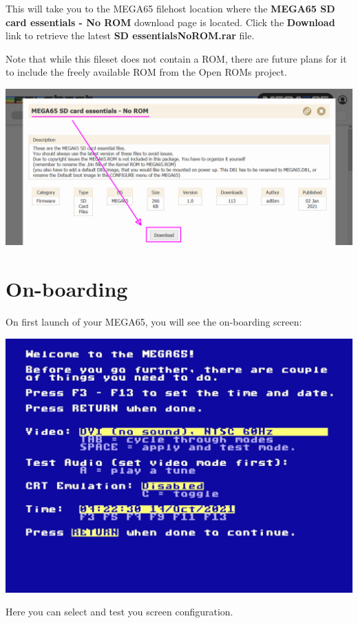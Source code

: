 This will take you to the MEGA65 filehost location where the \textbf{MEGA65 SD card essentials - No ROM} download
page is located. Click the \textbf{Download} link to retrieve the latest \textbf{SD essentialsNoROM.rar} file.

Note that while this fileset does not contain a ROM, there are future plans for it to include the freely available ROM from the Open ROMs project.

\includegraphics[width=\linewidth]{images/latest_support_files.png}

\section{On-boarding}
\label{onboarding}

On first launch of your MEGA65, you will see the on-boarding screen:

\begin{center}
  \includegraphics[trim= 10mm 15mm 10mm 10mm,clip,width=0.7\linewidth]{images/img011_final_boot_01.png}
\end{center}

Here you can select and test you screen configuration.

